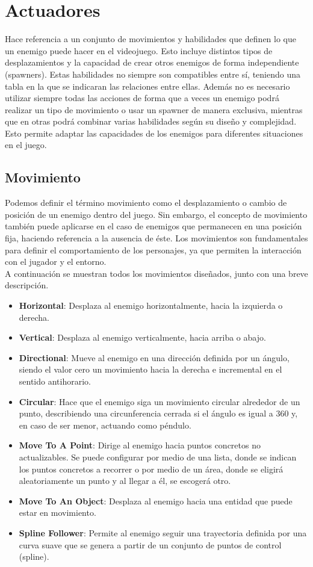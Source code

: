 \section{Actuadores}
\label{subsec:acciones}
Hace referencia a un conjunto de movimientos y habilidades que definen lo que un enemigo puede hacer en el videojuego. Esto incluye distintos tipos de desplazamientos y la capacidad de crear otros enemigos de forma independiente (spawners). Estas habilidades no siempre son compatibles entre sí, teniendo una tabla en la que se indicaran las relaciones entre ellas. Además no es necesario utilizar siempre todas las acciones de forma que a veces un enemigo podrá realizar un tipo de movimiento o usar un spawner de manera exclusiva, mientras que en otras podrá combinar varias habilidades según su diseño y complejidad. Esto permite adaptar las capacidades de los enemigos para diferentes situaciones en el juego.

\subsection{Movimiento}
Podemos definir el término movimiento como el desplazamiento o cambio de posición de un enemigo dentro del juego. Sin embargo, el concepto de movimiento también puede aplicarse en el caso de enemigos que permanecen en una posición fija, haciendo referencia a la ausencia de éste. Los movimientos son fundamentales para definir el comportamiento de los personajes, ya que permiten la interacción con el jugador y el entorno.\\

A continuación se muestran todos los movimientos diseñados, junto con una breve descripción.
\begin{itemize}
  \item \textbf{Horizontal}: Desplaza al enemigo horizontalmente, hacia la izquierda o derecha.
    \item \textbf{Vertical}: Desplaza al enemigo verticalmente, hacia arriba o abajo.
    \item \textbf{Directional}: Mueve al enemigo en una dirección definida por un ángulo, siendo el valor cero un movimiento hacia la derecha e incremental en el sentido antihorario.
    \item \textbf{Circular}: Hace que el enemigo siga un movimiento circular alrededor de un punto, describiendo una circunferencia cerrada si el ángulo es igual a 360 y, en caso de ser menor, actuando como péndulo.
    \item \textbf{Move To A Point}\label{sec:MoveToAPoint}: Dirige al enemigo hacia puntos concretos no actualizables. Se puede configurar por medio de una lista, donde se indican los puntos concretos a recorrer o por medio de un área, donde se eligirá aleatoriamente un punto y al llegar a él, se escogerá otro.
    \item \textbf{Move To An Object}: Desplaza al enemigo hacia una entidad que puede estar en movimiento.
    \item \textbf{Spline Follower}: Permite al enemigo seguir una trayectoria definida por una curva suave que se genera a partir de un conjunto de puntos de control (spline).
\end{itemize}

